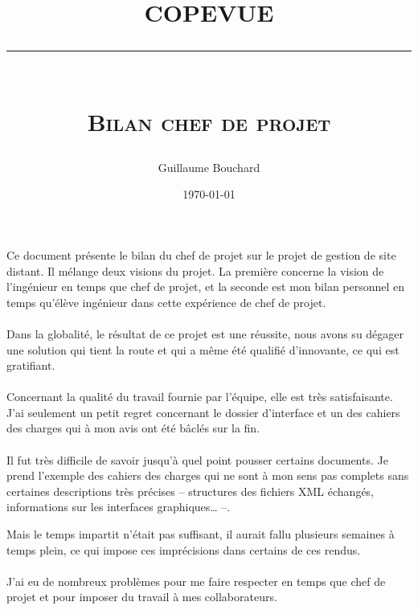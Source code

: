 \documentclass[a4paper, 11pt, draft]{article}
\title{\textbf{COPEVUE}\\
\rule{\textwidth}{1pt}{}\\
\Huge{\textsc{Bilan chef de projet}}}
\author{Guillaume Bouchard}
\date{\today{}}
\begin{document}
\maketitle

Ce document présente le bilan du chef de projet sur le projet de gestion de
site distant. Il mélange deux visions du projet. La première concerne la
vision de l'ingénieur en temps que chef de projet, et la seconde est mon
bilan personnel en temps qu'élève ingénieur dans cette expérience de chef de
projet.

\paragraph{}

Dans la globalité, le résultat de ce projet est une réussite, nous avons su
dégager une solution qui tient la route et qui a même été qualifié
d'innovante, ce qui est gratifiant.

\paragraph{}

Concernant la qualité du travail fournie par l'équipe, elle est très
satisfaisante. J'ai seulement un petit regret concernant le dossier
d'interface et un des cahiers des charges qui à mon avis ont été bâclés sur
la fin.

\paragraph{}

Il fut très difficile de savoir jusqu'à quel point pousser certains
documents.  Je prend l'exemple des cahiers des charges qui ne sont à mon
sens pas complets sans certaines descriptions très précises -- structures
des fichiers XML échangés, informations sur les interfaces graphiques\ldots
--.

Mais le temps impartit n'était pas suffisant, il aurait fallu plusieurs
semaines à temps plein, ce qui impose ces imprécisions dans certains de ces
rendus.


\paragraph{}

J'ai eu de nombreux problèmes pour me faire respecter en temps que chef de
projet et pour imposer du travail à mes collaborateurs.
\end{document}
